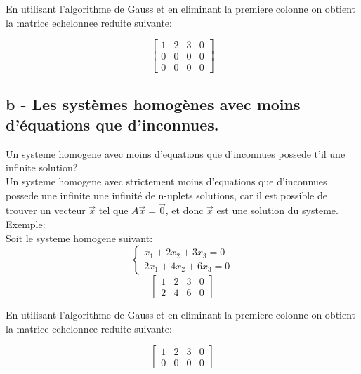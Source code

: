 \documentclass{config/homework}
\begin{document}
    En utilisant l'algorithme de Gauss et en eliminant la premiere colonne on obtient la matrice echelonnee reduite suivante:

    \[
        \left[
        \begin{array}{rrr|r}
                1 & 2 & 3 & 0 \\
                0 & 0 & 0 & 0 \\
                0 & 0 & 0 & 0
        \end{array}
        \right]
    \]

    \noindent{}


    \newpage

    \subsection{b - Les systèmes homogènes avec moins d’équations que d’inconnues.}\label{subsec:b}
    Un systeme homogene avec moins d'equations que d'inconnues possede t'il une infinite solution? \\

    Un systeme homogene avec strictement moins d'equations que d'inconnues possede une infinite une infinité de
    n-uplets solutions, car il est possible de trouver un vecteur
    $\vec{x}$ tel que $A\vec{x} = \vec{0}$, et donc $\vec{x}$
    est une solution du systeme.\\

    Exemple:\\
    Soit le systeme homogene suivant:
    \[
        \begin{cases}
            x_1 + 2x_2 + 3x_3 = 0 \\
            2x_1 + 4x_2 + 6x_3 = 0
        \end{cases}
    \]
    \[
        \left[
            \begin{array}{rrr|r}
                1 & 2 & 3 & 0 \\
                2 & 4 & 6 & 0
            \end{array}
        \right]
    \]

    En utilisant l'algorithme de Gauss et en eliminant la premiere colonne
    on obtient la matrice echelonnee reduite suivante:

\[
        \left[
        \begin{array}{rrr|r}
                1 & 2 & 3 & 0 \\
                0 & 0 & 0 & 0
        \end{array}
        \right]
    \]
\end{document}
